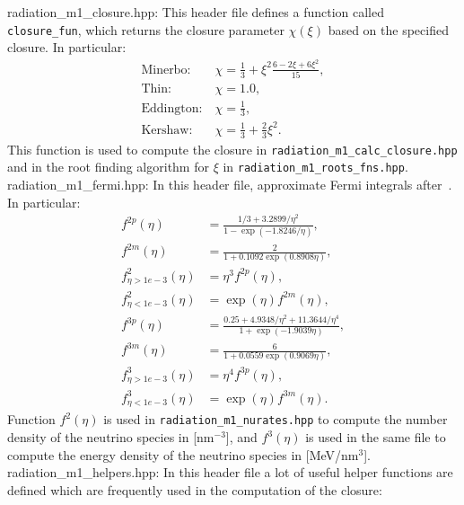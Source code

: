 \documentclass{article}
\newcommand{\var}[1]{%
  {\setlength{\fboxsep}{1.5pt}%
   \colorbox{varbg}{\textcolor{varfg}{\texttt{\small #1}}}}}
\begin{document}
{\color{gray}radiation\_m1\_closure.hpp:} This header file defines a function called \var{closure\_fun}, which returns the closure parameter $\chi(\xi)$ based
on the specified closure. In particular:
\begin{align}
  \text{Minerbo:}&\ \chi=\frac{1}{3}+\xi^2\frac{6-2\xi+6\xi^2}{15},\\
  \text{Thin:}&\ \chi=1.0,\\
  \text{Eddington:}&\ \chi=\frac{1}{3},\\
  \text{Kershaw:}&\ \chi=\frac{1}{3}+\frac{2}{3}\xi^2.
\end{align}
This function is used to compute the closure in \var{radiation\_m1\_calc\_closure.hpp} and in the root finding algorithm for
$\xi$ in \var{radiation\_m1\_roots\_fns.hpp}.\\
{\color{gray}radiation\_m1\_fermi.hpp:} In this header file, approximate Fermi integrals after~\cite{etde_6448430}.
In particular:
\begin{align}
  f^{2p}(\eta)&=\frac{1/3+3.2899/\eta^2}{1-\exp{(-1.8246/\eta)}},\\
  f^{2m}(\eta)&=\frac{2}{1+0.1092\exp{(0.8908\eta)}},\\
  f^{2}_{\eta>1e-3}(\eta)&=\eta^3f^{2p}(\eta),\\
  f^{2}_{\eta<1e-3}(\eta)&=\exp{(\eta)}f^{2m}(\eta),\\
  f^{3p}(\eta)&=\frac{0.25+4.9348/\eta^2+11.3644/\eta^4}{1+\exp{(-1.9039\eta)}},\\
  f^{3m}(\eta)&=\frac{6}{1+0.0559\exp{(0.9069\eta)}},\\
  f^{3}_{\eta>1e-3}(\eta)&=\eta^4f^{3p}(\eta),\\
  f^{3}_{\eta<1e-3}(\eta)&=\exp{(\eta)}f^{3m}(\eta).
\end{align}
Function $f^{2}(\eta)$ is used in \var{radiation\_m1\_nurates.hpp} to compute the number density of the neutrino species in
[nm$^{-3}$], and $f^{3}(\eta)$ is used in the same file to compute the energy density of the neutrino species in
[MeV/nm$^3$].\\
{\color{gray}radiation\_m1\_helpers.hpp:} In this header file a lot of useful helper functions are defined which are frequently used in the
computation of the closure:
\end{document}
